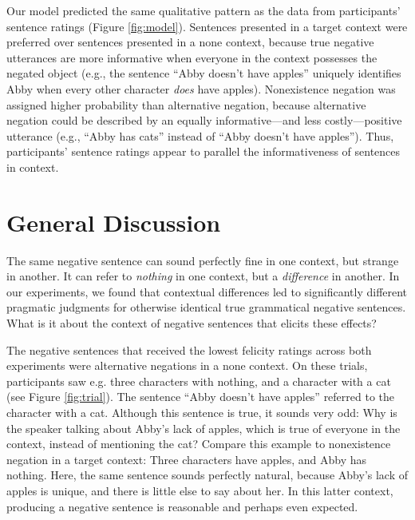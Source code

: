 \documentclass[10pt,letterpaper]{article}
\begin{document}
Our model predicted the same qualitative pattern as the data from participants' sentence ratings (Figure \ref{fig:model}).  Sentences presented in a target context were preferred over sentences presented in a none context, because true negative utterances are more informative when everyone in the context possesses the negated object (e.g., the sentence ``Abby doesn't have apples'' uniquely identifies Abby when every other character \emph{does} have apples).  Nonexistence negation was assigned higher probability than alternative negation, because alternative negation could be described by an equally informative---and less costly---positive utterance (e.g., ``Abby has cats'' instead of ``Abby doesn't have apples'').  Thus, participants' sentence ratings appear to parallel the informativeness of sentences in context.  

\section{General Discussion}

The same negative sentence can sound perfectly fine in one context, but strange in another.  It can refer to \emph{nothing} in one context, but a \emph{difference} in another. In our experiments, we found that contextual differences led to significantly different pragmatic judgments for otherwise identical true grammatical negative sentences.  What is it about the context of negative sentences that elicits these effects?  

The negative sentences that received the lowest felicity ratings across both experiments were alternative negations in a none context.  On these trials, participants saw e.g. three characters with nothing, and a character with a cat (see Figure \ref{fig:trial}).  The sentence ``Abby doesn't have apples'' referred to the character with a cat.  Although this sentence is true, it sounds very odd: Why is the speaker talking about Abby's lack of apples, which is true of everyone in the context, instead of mentioning the cat?  Compare this example to nonexistence negation in a target context: Three characters have apples, and Abby has nothing.  Here, the same sentence sounds perfectly natural, because Abby's lack of apples is unique, and there is little else to say about her.  In this latter context, producing a negative sentence is reasonable and perhaps even expected.
\end{document}
